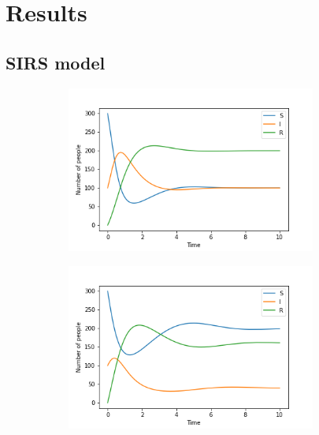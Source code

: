 \documentclass[../main.tex]{subfiles}
\begin{document}
\section{Results}\label{sec:results}

\subsection{SIRS model}
\begin{figure}[htb!]
    \centering
    \begin{subfigure}[b]{0.475\textwidth}
    \centering
    \includegraphics[width=0.9\textwidth]{../figures/SIRS_rk4_b=1.png}
    \caption{}
    \label{fig:b=1}
    \end{subfigure}
    \quad
    \begin{subfigure}[b]{0.475\textwidth}
    \includegraphics[width=0.9\textwidth]{../figures/SIRS_rk4_b=2.png}
    \caption{}
    \label{fig:b=2}
    \end{subfigure}
    

\end{figure}
\end{document}
